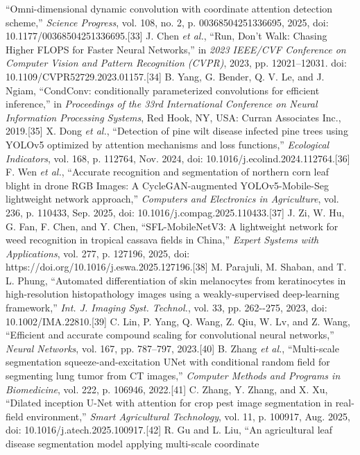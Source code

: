 \documentclass[
]{article}
\begin{document}
``Omni-dimensional dynamic convolution with coordinate attention
detection scheme,'' \emph{Science Progress}, vol. 108, no. 2, p.
00368504251336695, 2025, doi: 10.1177/00368504251336695.{[}33{]} J. Chen
\emph{et al.}, ``Run, Don't Walk: Chasing Higher FLOPS for Faster Neural
Networks,'' in \emph{2023 IEEE/CVF Conference on Computer Vision and
Pattern Recognition (CVPR)}, 2023, pp. 12021--12031. doi:
10.1109/CVPR52729.2023.01157.{[}34{]} B. Yang, G. Bender, Q. V. Le, and
J. Ngiam, ``CondConv: conditionally parameterized convolutions for
efficient inference,'' in \emph{Proceedings of the 33rd International
Conference on Neural Information Processing Systems}, Red Hook, NY, USA:
Curran Associates Inc., 2019.{[}35{]} X. Dong \emph{et al.}, ``Detection
of pine wilt disease infected pine trees using YOLOv5 optimized by
attention mechanisms and loss functions,'' \emph{Ecological Indicators},
vol. 168, p. 112764, Nov. 2024, doi:
10.1016/j.ecolind.2024.112764.{[}36{]} F. Wen \emph{et al.}, ``Accurate
recognition and segmentation of northern corn leaf blight in drone RGB
Images: A CycleGAN-augmented YOLOv5-Mobile-Seg lightweight network
approach,'' \emph{Computers and Electronics in Agriculture}, vol. 236,
p. 110433, Sep. 2025, doi: 10.1016/j.compag.2025.110433.{[}37{]} J. Zi,
W. Hu, G. Fan, F. Chen, and Y. Chen, ``SFL-MobileNetV3: A lightweight
network for weed recognition in tropical cassava fields in China,''
\emph{Expert Systems with Applications}, vol. 277, p. 127196, 2025, doi:
https://doi.org/10.1016/j.eswa.2025.127196.{[}38{]} M. Parajuli, M.
Shaban, and T. L. Phung, ``Automated differentiation of skin melanocytes
from keratinocytes in high-resolution histopathology images using a
weakly-supervised deep-learning framework,'' \emph{Int. J. Imaging Syst.
Technol.}, vol. 33, pp. 262-\/-275, 2023, doi:
10.1002/IMA.22810.{[}39{]} C. Lin, P. Yang, Q. Wang, Z. Qiu, W. Lv, and
Z. Wang, ``Efficient and accurate compound scaling for convolutional
neural networks,'' \emph{Neural Networks}, vol. 167, pp. 787--797,
2023.{[}40{]} B. Zhang \emph{et al.}, ``Multi-scale segmentation
squeeze-and-excitation UNet with conditional random field for segmenting
lung tumor from CT images,'' \emph{Computer Methods and Programs in
Biomedicine}, vol. 222, p. 106946, 2022.{[}41{]} C. Zhang, Y. Zhang, and
X. Xu, ``Dilated inception U-Net with attention for crop pest image
segmentation in real-field environment,'' \emph{Smart Agricultural
Technology}, vol. 11, p. 100917, Aug. 2025, doi:
10.1016/j.atech.2025.100917.{[}42{]} R. Gu and L. Liu, ``An agricultural
leaf disease segmentation model applying multi-scale coordinate
\end{document}
